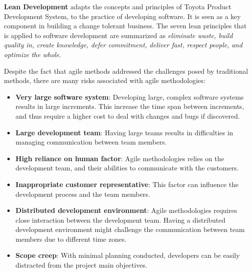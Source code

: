 \textbf{Lean Development} adapts the concepts and principles of Toyota Product Development System, to the practice of developing software\cite{Poppendieck:2007:LSD:1248821.1248986}. It is seen as a key component in building a change tolerant business\cite{cawley2010lean}. The seven lean principles that is applied to software development are summarized as \textit{eliminate waste, build quality in, create knowledge, defer commitment, deliver fast, respect people, and optimize the whole}\cite{Pressman:2009:SEP:1593949,Poppendieck:2007:LSD:1248821.1248986}. 

Despite the fact that agile methods addressed the challenges posed by traditional methods, there are many risks associated with agile methodologies\cite{hijazi2012review}:
\begin{itemize}
	\item \textbf{Very large software system}: Developing large, complex software systems results in large increments. This increase the time span between increments, and thus require a higher cost to deal with changes and bugs if discovered.
	\item \textbf{Large development team}: Having large teams results in difficulties in managing communication between team members.
	\item \textbf{High reliance on human factor}: Agile methodologies relies on the development team, and their abilities to communicate with the customers.
	\item \textbf{Inappropriate customer representative}: This factor can influence the development process and the team members.
	\item \textbf{Distributed development environment}: Agile methodologies requires close interaction between the development team. Having a distributed development environment might challenge the communication between team members due to different time zones.
	\item \textbf{Scope creep}: With minimal planning conducted, developers can be easily distracted from the project main objectives.
\end{itemize}


